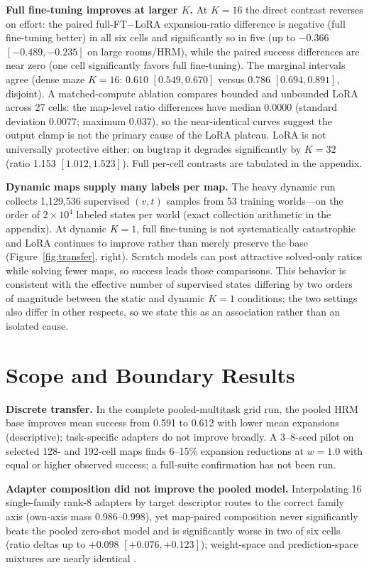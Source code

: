 \documentclass[letterpaper]{article} %
\begin{document}
\textbf{Full fine-tuning improves at larger $K$.} At $K{=}16$ the direct contrast reverses on effort: the paired full-FT$-$LoRA expansion-ratio difference is negative (full fine-tuning better) in all six cells and significantly so in five (up to $-0.366$ $[-0.489,-0.235]$ on large rooms/HRM), while the paired success differences are near zero (one cell significantly favors full fine-tuning). The marginal intervals agree (dense maze $K{=}16$: 0.610 $[0.549,0.670]$ versus 0.786 $[0.694,0.891]$, disjoint). A matched-compute ablation compares bounded and unbounded LoRA across 27 cells: the map-level ratio differences have median 0.0000 (standard deviation 0.0077; maximum 0.037), so the near-identical curves suggest the output clamp is not the primary cause of the LoRA plateau. LoRA is not universally protective either: on bugtrap it degrades significantly by $K{=}32$ (ratio 1.153 $[1.012,1.523]$). Full per-cell contrasts are tabulated in the appendix.

\textbf{Dynamic maps supply many labels per map.} The heavy dynamic run collects 1{,}129{,}536 supervised $(v,t)$ samples from 53 training worlds---on the order of $2\times10^{4}$ labeled states per world (exact collection arithmetic in the appendix). At dynamic $K{=}1$, full fine-tuning is not systematically catastrophic and LoRA continues to improve rather than merely preserve the base (Figure~\ref{fig:transfer}, right). Scratch models can post attractive solved-only ratios while solving fewer maps, so success leads those comparisons. This behavior is consistent with the effective number of supervised states differing by two orders of magnitude between the static and dynamic $K{=}1$ conditions; the two settings also differ in other respects, so we state this as an association rather than an isolated cause.

\section{Scope and Boundary Results}

\textbf{Discrete transfer.} In the complete pooled-multitask grid run, the pooled HRM base improves mean success from 0.591 to 0.612 with lower mean expansions (descriptive); task-specific adapters do not improve broadly. A 3--8-seed pilot on selected 128- and 192-cell maps finds 6--15\% expansion reductions at $w{=}1.0$ with equal or higher observed success; a full-suite confirmation has not been run.

\textbf{Adapter composition did not improve the pooled model.} Interpolating 16 single-family rank-8 adapters by target descriptor routes to the correct family axis (own-axis mass 0.986--0.998), yet map-paired composition never significantly beats the pooled zero-shot model and is significantly worse in two of six cells (ratio deltas up to $+0.098$ $[+0.076,+0.123]$); weight-space and prediction-space mixtures are nearly identical \citep{wortsman2022soups,ilharco2022task}.
\end{document}
